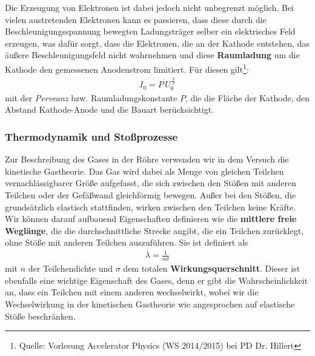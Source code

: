 \documentclass[11pt, a4paper]{article}
\begin{document}
Die Erzeugung von Elektronen ist dabei jedoch nicht unbegrenzt möglich.
Bei vielen austretenden Elektronen kann es passieren, dass diese durch die Beschleunigungsspannung bewegten Ladungsträger selber ein elektrisches Feld erzeugen, was dafür sorgt, dass die Elektronen, die an der Kathode entstehen, das äußere Beschleunigungsfeld nicht wahrnehmen und diese \textbf{Raumladung} um die Kathode den gemessenen Anodenstrom limitiert.
Für diesen gilt\footnote{Quelle: Vorlesung Accelerator Physics (WS 2014/2015) bei PD Dr. Hillert}:
\begin{align}
I_0=P\,U_0^{\,\frac{3}{2}}
\end{align}
mit der \emph{Perveanz} bzw. Raumladungskonstante $P$, die die Fläche der Kathode, den Abstand Kathode-Anode und die Bauart berücksichtigt.

\subsubsection{Thermodynamik und Stoßprozesse}

Zur Beschreibung des Gases in der Röhre verwenden wir in dem Versuch die kinetische Gastheorie.
Das Gas wird dabei als Menge von gleichen Teilchen vernachlässigbarer Größe aufgefasst, die sich zwischen den Stößen mit anderen Teilchen oder der Gefäßwand gleichförmig bewegen.
Außer bei den Stößen, die grundsätzlich elastisch stattfinden, wirken zwischen den Teilchen keine Kräfte.
Wir können darauf aufbauend Eigenschaften definieren wie die \textbf{mittlere freie Weglänge}, die die durchschnittliche Strecke angibt, die ein Teilchen zurücklegt, ohne Stöße mit anderen Teilchen auszuführen.
Sie ist definiert als
\begin{align}
\lambda=\frac{1}{n\sigma}
\end{align}
mit $n$ der Teilchendichte und $\sigma$ dem totalen \textbf{Wirkungsquerschnitt}.
Dieser ist ebenfalls eine wichtige Eigenschaft des Gases, denn er gibt die Wahrscheinlichkeit an, dass ein Teilchen mit einem anderen wechselwirkt, wobei wir die Wechselwirkung in der kinetischen Gastheorie wie angesprochen auf elastische Stöße beschränken.
\end{document}
